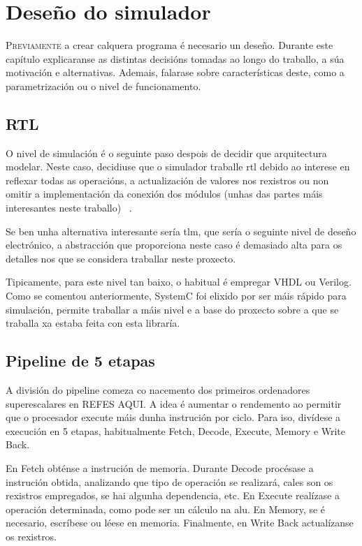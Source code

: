 \chapter{Deseño do simulador}
\label{chap:deseño_simulador}

\lettrine{P}{reviamente} a crear calquera programa é necesario un deseño. Durante este capítulo explicaranse as distintas decisións tomadas ao longo do traballo, a súa motivación e alternativas. Ademais, falarase sobre características deste, como a parametrización ou o nivel de funcionamento.

\section{RTL}\label{sec:rtl}
O nivel de simulación é o seguinte paso despois de decidir que arquitectura modelar. Neste caso, decidiuse que o simulador traballe \acrfull{rtl} debido ao interese en reflexar todas as operacións, a actualización de valores nos rexistros ou non omitir a implementación da conexión dos módulos (unhas das partes máis interesantes neste traballo) ~\cite{rtl_wikipedia}.

Se ben unha alternativa interesante sería \acrfull{tlm}, que sería o seguinte nivel de deseño electrónico, a abstracción que proporciona neste caso é demasiado alta para os detalles nos que se considera traballar neste proxecto.  

Tipicamente, para este nivel tan baixo, o habitual é empregar VHDL ou Verilog. Como se comentou anteriormente, SystemC foi elixido por ser máis rápido para simulación, permite traballar a máis nivel e a base do proxecto sobre a que se traballa xa estaba feita con esta libraría.



\section{Pipeline de 5 etapas}\label{sec:pipeline_5etapas}
A división do pipeline comeza co nacemento dos primeiros ordenadores superescalares en REFES AQUI. A idea é aumentar o rendemento ao permitir que o procesador execute máis dunha instrución por ciclo. Para iso, divídese a execución en 5 etapas, habitualmente Fetch, Decode, Execute, Memory e Write Back.


En Fetch obténse a instrución de memoria. Durante Decode procésase a instrución obtida, analizando que tipo de operación se realizará, cales son os rexistros empregados, se hai algunha dependencia, etc. En Execute realízase a operación determinada, como pode ser un cálculo na \acrfull{alu}. En Memory, se é necesario, escríbese ou léese en memoria. Finalmente, en Write Back actualízanse os rexistros.


